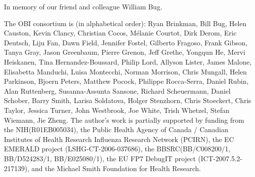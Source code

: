 \documentclass[jou]{ao2e}%
\begin{document}
In memory of our friend and colleague William Bug. 

The OBI consortium is (in alphabetical order): Ryan Brinkman, Bill Bug, Helen Causton, Kevin Clancy, Christian Cocos, M\'elanie Courtot, Dirk Derom, Eric Deutsch, Liju Fan, Dawn Field, Jennifer Fostel, Gilberto Fragoso, Frank Gibson, Tanya Gray, Jason Greenbaum, Pierre Grenon, Jeff Grethe, Yongqun He, Mervi Heiskanen, Tina Hernandez-Boussard, Philip Lord, Allyson Lister, James Malone, Elisabetta Manduchi, Luisa Montecchi, Norman Morrison, Chris Mungall, Helen Parkinson, Bjoern Peters, Matthew Pocock, Philippe Rocca-Serra, Daniel Rubin, Alan Ruttenberg, Susanna-Assunta Sansone, Richard Scheuermann, Daniel Schober, Barry Smith, Larisa Soldatova, Holger Stenzhorn, Chris Stoeckert, Chris Taylor, Jessica Turner, John Westbrook,  Joe White, Trish Whetzel, Stefan Wiemann, Jie Zheng. 
The author's work is partially supported by funding from the NIH(R01EB005034),  the Public Health Agency of Canada / Canadian Institutes of Health Research Influenza Research Network (PCIRN), the EC EMERALD project (LSHG-CT-2006-037686), the BBSRC(BB/C008200/1, BB/D524283/1, BB/E025080/1), the EU FP7 DebugIT project (ICT-2007.5.2-217139), and the Michael Smith Foundation for Health Research.


%
\end{document}
